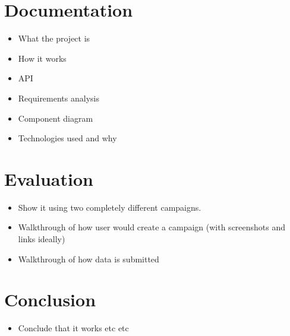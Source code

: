 \documentclass{article}
\begin{document}
	\section{Documentation}
		\begin{itemize}
			\item What the project is
			\item How it works
			\item API
			\item Requirements analysis
			\item Component diagram
			\item Technologies used and why
		\end{itemize}
	\section{Evaluation}
		\begin{itemize}
			\item Show it using two completely different campaigns.
			\item Walkthrough of how user would create a campaign (with screenshots and links ideally)
			\item Walkthrough of how data is submitted
		\end{itemize}
	\section{Conclusion}
		\begin{itemize}
			\item Conclude that it works etc etc
		\end{itemize}
\end{document}
